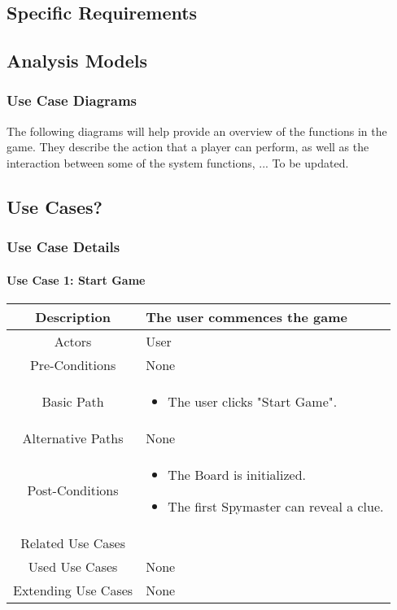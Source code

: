 \documentclass[10pt, a4paper]{article}
\begin{document}
	
	\subsection{Specific Requirements}
	
	\subsection{Analysis Models}
	
		\subsubsection{Use Case Diagrams}
		
		The following diagrams will help provide an overview of the functions in the game. They describe the action that a player can perform, as well as the interaction between some of the system functions, ... To be updated.\\
		
		\subsection{Use Cases?}
		
		\subsubsection{Use Case Details}
			\paragraph{Use Case 1: Start Game }
			
			\begin{center}
				\begin{tabular}{ |c|p{7cm}| } 
					\hline
					Description & The user commences the game  \\
					\hline 
					Actors & User \\
					\hline  
					Pre-Conditions & None \\
					\hline  
					Basic Path & 
					
					\begin{itemize}
						
						\item The user clicks "Start Game".
					\end{itemize}\\
					\hline
					Alternative Paths & None \\
					\hline
					Post-Conditions & \begin{itemize}
						\item The Board is initialized.
						\item The first Spymaster can reveal a clue. 
					\end{itemize} \\
					\hline 
					Related Use Cases & \\
					\hline 
					Used Use Cases & None \\
					\hline 
					Extending Use Cases & None \\
					\hline 
				\end{tabular}
			\end{center}
	
\end{document}
